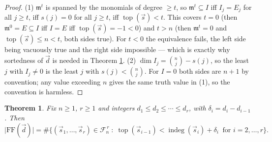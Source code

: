 \documentclass[11pt, a4paper, abstract=yes]{scrartcl}
\theoremstyle{definition}
\theoremstyle{remark}
\theoremstyle{plain}
\newtheorem{theorem}[definition]{Theorem}
\newcommand{\indeg}{\operatorname{indeg}}
\newcommand{\tp}{\operatorname{top}}
\begin{document}
\begin{proof}
(1) \(\mathfrak m^t\) is spanned by the monomials of degree \(\ge t\), so
\(\mathfrak m^t\subseteq I\) iff \(I_j=E_j\) for all \(j\ge t\), iff \(s(j)=0\) for all \(j\ge t\),
iff \(\tp(\vec s)<t\). This covers \(t=0\) (then \(\mathfrak m^0=E\subseteq I\) iff \(I=E\) iff
\(\tp(\vec s)=-1<0\)) and \(t>n\) (then \(\mathfrak m^t=0\) and \(\tp(\vec s)\le n<t\), both sides true). For
\(t<0\) the equivalence fails, the left side being vacuously true and the right side impossible ---
which is exactly why sortedness of \(\vec d\) is needed in Theorem \ref{thm-chaining}.
(2) \(\dim I_j=\binom nj-s(j)\), so the least \(j\) with \(I_j\ne0\) is the least \(j\) with
\(s(j)<\binom nj\). For \(I=0\) both sides are \(n+1\) by convention; any value exceeding \(n\) gives
the same truth value in (1), so the convention is harmless.
\end{proof}

\begin{theorem}
Fix \(n\ge1\), \(r\ge1\) and integers \(d_1\le d_2\le\cdots\le d_r\), with
\(\delta_i=d_i-d_{i-1}\). Then
\begin{equation}\label{eq:auto-14}
  \lvert\mathrm{FF}(\vec d)\rvert=\#\bigl\lbrace(\vec s_1,\dots,\vec s_r)\in\mathcal F_n^{\,r}\;:\;
  \tp(\vec s_{i-1})<\indeg(\vec s_i)+\delta_i\ \text{ for } i=2,\dots,r\bigr\rbrace .
\end{equation}
\label{thm-chaining}
\end{theorem}
\end{document}
